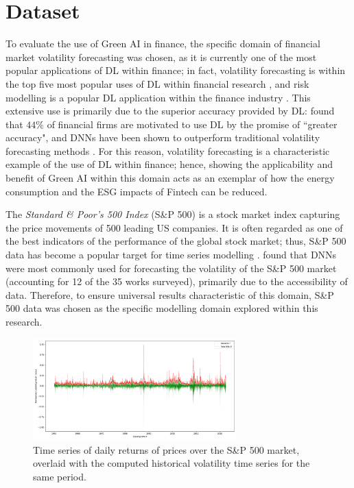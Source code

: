 \documentclass[a4paper, 11pt]{report}
\begin{document}
    \section{Dataset}
    \label{section: dataset}

    To evaluate the use of Green AI in finance, the specific domain of financial market volatility forecasting was chosen, as it is currently one of the most popular applications of DL within finance; in fact, volatility forecasting is within the top five most popular uses of DL within financial research \citep{sezer-2019}, and risk modelling is a popular DL application within the finance industry \citep{chartis-2019}. This extensive use is primarily due to the superior accuracy provided by DL: \citet{chartis-2019} found that $44\%$ of financial firms are motivated to use DL by the promise of ``greater accuracy", and DNNs have been shown to outperform traditional volatility forecasting methods \citep{rodikov-2022}. For this reason, volatility forecasting is a characteristic example of the use of DL within finance; hence, showing the applicability and benefit of Green AI within this domain acts as an exemplar of how the energy consumption and the ESG impacts of Fintech can be reduced.


    The \emph{Standard \& Poor's 500 Index} (S\&P 500) is a stock market index capturing the price movements of 500 leading US companies. It is often regarded as one of the best indicators of the performance of the global stock market; thus, S\&P 500 data has become a popular target for time series modelling \citep{thakkar-2021}. \citet{ge-2022} found that DNNs were most commonly used for forecasting the volatility of the S\&P 500 market (accounting for 12 of the 35 works surveyed), primarily due to the accessibility of data. Therefore, to ensure universal results characteristic of this domain, S\&P 500 data was chosen as the specific modelling domain explored within this research.

    \begin{figure}[ht]
        \centering
        \includegraphics[width=0.7\textwidth]{volatility.png}
        \caption{\centering Time series of daily returns of prices over the S\&P 500 market, overlaid with the computed historical volatility time series for the same period.}
        \label{fig: ret-vol}
    \end{figure}
\end{document}
